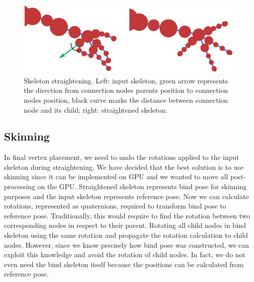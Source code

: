 \begin{figure}[h]
    \centering
    \includegraphics[width=\textwidth]{images/straightening2.png}
    \caption[Skeleton straightening]{Skeleton straightening. Left: input skeleton, green arrow represents the direction from connection nodes parents position to connection nodes position, black curve marks the distance between connection node and its child; right: straightened skeleton.}
    \label{fig:straightening_ilu}
\end{figure}

\subsection{Skinning}
In final vertex placement, we need to undo the rotations applied to the input skeleton during straightening. We have decided that the best solution is to use skinning since it can be implemented on GPU and we wanted to move all post-processing on the GPU. Straightened skeleton represents bind pose for skinning purposes and the input skeleton represents reference pose. Now we can calculate rotations, represented as quaternions, required to transform bind pose to reference pose. Traditionally, this would require to find the rotation between two corresponding nodes in respect to their parent. Rotating all child nodes in bind skeleton using the same rotation and propagate the rotation calculation to child nodes. However, since we know precisely how bind pose was constructed, we can exploit this knowledge and avoid the rotation of child nodes.
In fact, we do not even need the bind skeleton itself because the positions can be calculated from reference pose.

